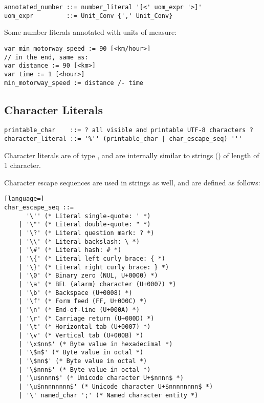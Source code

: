 \syntax\begin{lstlisting}
annotated_number ::= number_literal '[<' uom_expr '>]'
uom_expr         ::= Unit_Conv {',' Unit_Conv}
\end{lstlisting}

\example Some number literals annotated with units of measure:
\begin{lstlisting}
var min_motorway_speed := 90 [<km/hour>]
// in the end, same as:
var distance := 90 [<km>]
var time := 1 [<hour>]
min_motorway_speed := distance /- time
\end{lstlisting}






\subsection{Character Literals}
\label{sec:characterliterals}

\syntax\begin{lstlisting}
printable_char    ::= ? all visible and printable UTF-8 characters ? 
character_literal ::= '%'' (printable_char | char_escape_seq) '''
\end{lstlisting}

Character literals are of type , and are internally similar to strings () of length of 1 character. 

Character escape sequences are used in strings as well, and are defined as follows: 

\syntax\begin{lstlisting}[language=]
char_escape_seq ::= 
      '\'' (* Literal single-quote: ' *)
    | '\"' (* Literal double-quote: " *)
    | '\?' (* Literal question mark: ? *)
    | '\\' (* Literal backslash: \ *)
    | '\#' (* Literal hash: # *)
    | '\{' (* Literal left curly brace: { *)
    | '\}' (* Literal right curly brace: } *)
    | '\0' (* Binary zero (NUL, U+0000) *)
    | '\a' (* BEL (alarm) character (U+0007) *)
    | '\b' (* Backspace (U+0008) *)
    | '\f' (* Form feed (FF, U+000C) *)
    | '\n' (* End-of-line (U+000A) *)
    | '\r' (* Carriage return (U+000D) *)
    | '\t' (* Horizontal tab (U+0007) *)
    | '\v' (* Vertical tab (U+000B) *)
    | '\x$nn$' (* Byte value in hexadecimal *) 
    | '\$n$' (* Byte value in octal *)
    | '\$nn$' (* Byte value in octal *)
    | '\$nnn$' (* Byte value in octal *)
    | '\u$nnnn$' (* Unicode character U+$nnnn$ *)
    | '\u$nnnnnnnn$' (* Unicode character U+$nnnnnnnn$ *)
    | '\' named_char ';' (* Named character entity *)
\end{lstlisting}

